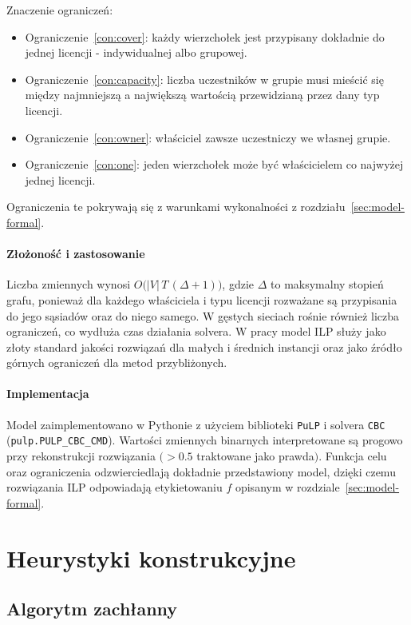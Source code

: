 \noindent
Znaczenie ograniczeń:
\begin{itemize}
  \item Ograniczenie~\ref{con:cover}: każdy wierzchołek jest przypisany dokładnie do jednej licencji - indywidualnej albo grupowej.
  \item Ograniczenie~\ref{con:capacity}: liczba uczestników w grupie musi mieścić się między najmniejszą a największą wartością przewidzianą przez dany typ licencji.
  \item Ograniczenie~\ref{con:owner}: właściciel zawsze uczestniczy we własnej grupie.
  \item Ograniczenie~\ref{con:one}: jeden wierzchołek może być właścicielem co najwyżej jednej licencji.
\end{itemize}
Ograniczenia te pokrywają się z warunkami wykonalności z rozdziału~\ref{sec:model-formal}.

\paragraph{Złożoność i zastosowanie}
Liczba zmiennych wynosi \(O\bigl(|V|\,T\,(\Delta+1)\bigr)\), gdzie \(\Delta\) to maksymalny stopień grafu, ponieważ dla każdego właściciela i typu licencji rozważane są przypisania do jego sąsiadów oraz do niego samego. W gęstych sieciach rośnie również liczba ograniczeń, co wydłuża czas działania solvera. W pracy model ILP służy jako złoty standard jakości rozwiązań dla małych i średnich instancji oraz jako źródło górnych ograniczeń dla metod przybliżonych.

\paragraph{Implementacja}
Model zaimplementowano w Pythonie z użyciem biblioteki \texttt{PuLP} i solvera \texttt{CBC} (\texttt{pulp.PULP\_CBC\_CMD}). Wartości zmiennych binarnych interpretowane są progowo przy rekonstrukcji rozwiązania \((>0.5\) traktowane jako prawda\().\) Funkcja celu oraz ograniczenia odzwierciedlają dokładnie przedstawiony model, dzięki czemu rozwiązania ILP odpowiadają etykietowaniu \(f\) opisanym w rozdziale~\ref{sec:model-formal}.

\section{Heurystyki konstrukcyjne}

\subsection{Algorytm zachłanny}\label{subsec:greedy}

